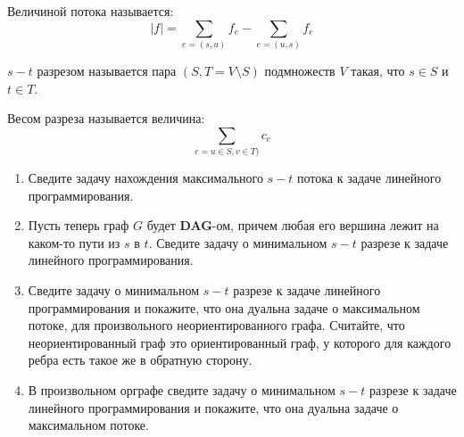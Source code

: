 \begin{enumerate}
	Величиной потока называется:
	\begin{equation*}
		|f| = \sum\limits_{e = (s, u)} f_e - \sum\limits_{e = (u, s)} f_e
	\end{equation*}
	
	$s-t$ разрезом называется пара $(S, T = V \setminus S)$ подмножеств $V$ такая, что $s \in S$ и $t \in T$. 
	
	Весом разреза называется величина:
	\begin{equation*}
		\sum\limits_{e = u\in S, v\in T)} c_e
	\end{equation*}
	
	\begin{enumerate}
		\item Сведите задачу нахождения максимального $s-t$ потока к задаче линейного программирования.
		\item Пусть теперь граф $G$ будет \textbf{DAG}-ом, причем любая его вершина лежит на каком-то пути из $s$ 
		в $t$. Сведите задачу о минимальном $s-t$ разрезе к задаче линейного программирования.
		\item Сведите задачу о минимальном $s-t$ разрезе к задаче линейного программирования и покажите, что она 
		дуальна задаче о максимальном потоке, для произвольного неориентированного графа. Считайте, что 
		неориентированный граф это ориентированный граф, у которого для каждого ребра есть такое же в обратную 
		сторону.
		\item В произвольном орграфе сведите задачу о минимальном $s-t$ разрезе к задаче линейного 
		программирования и покажите, что она дуальна задаче о максимальном потоке.
	\end{enumerate}
\end{enumerate}



